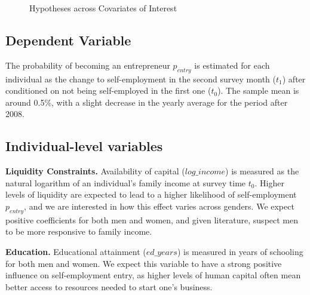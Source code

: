 \begin{figure}[hbtp]
        \caption{Hypotheses across Covariates of Interest}  
\end{figure}

\subsection{Dependent Variable}

The probability of becoming an entrepreneur $p_{entry}$ is estimated for each individual as the change to self-employment in the second survey month ($t_1$) after conditioned on not being self-employed in the first one ($t_0$). The sample mean is around 0.5\%, with a slight decrease in the yearly average for the period after 2008. 

\subsection{Individual-level variables}

\textbf{Liquidity Constraints.} Availability of capital ($log\_income$) is measured as the natural logarithm of an individual's family income at survey time $t_0$. Higher levels of liquidity are expected to lead to a higher likelihood of self-employment $p_{entry}$, and we are interested in how this effect varies across genders. We expect positive coefficients for both men and women, and given literature, suspect men to be more responsive to family income. 

\textbf{Education.} Educational attainment ($ed\_years$) is measured in years of schooling for both men and women. We expect this variable to have a strong positive influence on self-employment entry, as higher levels of human capital often mean better access to resources needed to start one's business. 

